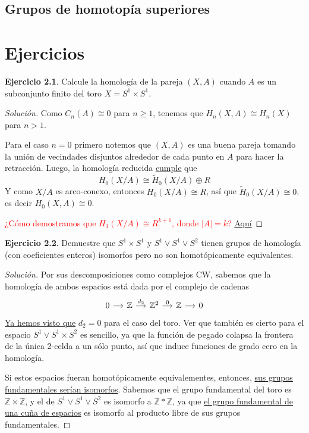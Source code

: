 \documentclass[spanish]{book}
\theoremstyle{definition}
\newtheorem*{ejer}{Ejercicio}
\newcommand{\Z}{\mathbb{Z}}
\begin{document}
\section{Grupos de homotopía superiores}
	
\newpage
\chapter{Ejercicios}
	\begin{ejer}
	Calcule la homología de la pareja $(X,A)$ cuando $A$ es un subconjunto finito del toro $X=S^1\times S^1$.
\end{ejer}
\begin{proof}[Solución]
	Como $C_n(A)\cong0$ para $n\geq1$, tenemos que $H_n(X,A)\cong H_n(X)$ para $n>1$.
	
	Para el caso $n=0$ primero notemos que $(X,A)$ es una buena pareja tomando la unión de vecindades disjuntos alrededor de cada punto en $A$ para hacer la retracción. Luego, la homología reducida \hyperref[sec:6.4]{cumple} que
	\[H_0(X/A)\cong\tilde{H}_0(X/A)\oplus R\]
	Y como $X/A$ es arco-conexo, entonces $H_0(X/A)\cong R$, así que $\tilde{H}_0(X/A)\cong0$, es decir $H_0(X,A)\cong0$.
	
	\textcolor{red}{¿Cómo demostramos que $H_1(X/A)\cong R^{k+1}$, donde $|A|=k$?} \href{https://math.stackexchange.com/questions/129686/finding-the-homology-group-of-h-n-x-a-when-a-is-a-finite-set-of-points}{Aquí}
\end{proof}
\begin{ejer}Demuestre que $S^1 \times S^1$ y $S^1 \vee S^1 \vee S^2$ tienen grupos de homología (con coeficientes enteros) isomorfos pero no son homotópicamente equivalentes.
\begin{proof}[Solución]
	Por sus descomposiciones como complejos CW, sabemos que la homología de ambos espacios está dada por el complejo de cadenas
	\[\begin{tikzcd}[column sep=small]
		0\arrow[r]&\Z\arrow[r,"d_2"]&\Z^2\arrow[r,"0"]&\Z\arrow[r]&0
	\end{tikzcd}\]
	\hyperref[ejem:toroCW]{Ya hemos visto que} $d_2=0$ para el caso del toro. Ver que también es cierto para el espacio $S^1\vee S^1\times S^2$ es sencillo, ya que la función de pegado colapsa la frontera de la única 2-celda a un sólo punto, así que induce funciones de grado cero en la homología.
	
	Si estos espacios fueran homotópicamente equivalementes, entonces, \hyperref[1.2.1]{sus grupos fundamentales serían isomorfos}. Sabemos que el grupo fundamental del toro es $\Z\times\Z$, y el de $S^1 \vee S^1 \vee S^2$ es isomorfo a $\Z\ast\Z$, ya que \hyperref[sec:grp-fund-cuña]{el grupo fundamental de una cuña de espacios} es isomorfo al producto libre de sus grupos fundamentales.
\end{proof}
\end{ejer}
\end{document}
